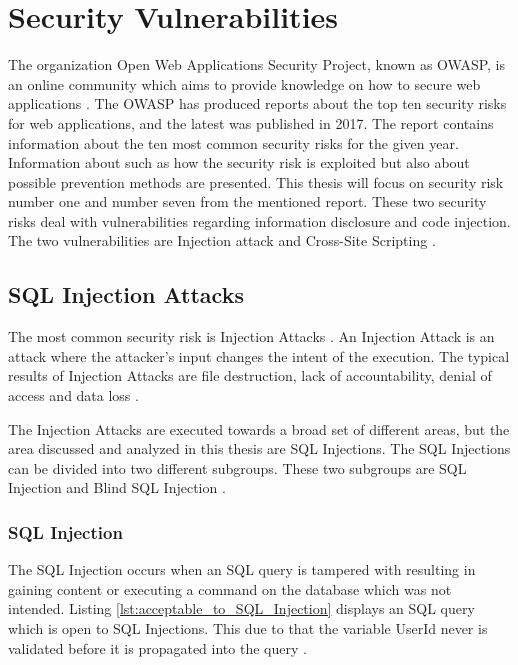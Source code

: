 \section{Security Vulnerabilities}
\label{SecurityVulnerabilities}
The organization Open Web Applications Security Project, known as OWASP, is an online community which aims to provide knowledge on how to secure web applications \parencite{OpenWebApplicationSecurityProject}. The OWASP has produced reports about the top ten security risks for web applications, and the latest was published in 2017. The report contains information about the ten most common security risks for the given year. Information about such as how the security risk is exploited but also about possible prevention methods are presented. This thesis will focus on security risk number one and number seven from the mentioned report. These two security risks deal with vulnerabilities regarding information disclosure and code injection. The two vulnerabilities are Injection attack and Cross-Site Scripting \parencite{OWASP2017}.



\subsection{SQL Injection Attacks}
The most common security risk is Injection Attacks \parencite{OWASP2017}. An Injection Attack is an attack where the attacker's input changes the intent of the execution. The typical results of Injection Attacks are file destruction, lack of accountability, denial of access and data loss \parencite{Secure_Web}.

The Injection Attacks are executed towards a broad set of different areas, but the area discussed and analyzed in this thesis are SQL Injections. The SQL Injections can be divided into two different subgroups. These two subgroups are SQL Injection and Blind SQL Injection \parencite{Secure_Web}.



\subsubsection{SQL Injection}
The SQL Injection occurs when an SQL query is tampered with resulting in gaining content or executing a command on the database which was not intended. Listing \ref{lst:acceptable_to_SQL_Injection} displays an SQL query which is open to SQL Injections. This due to that the variable UserId never is validated before it is propagated into the query \parencite{JustinClarke-Salt2009SIAa, Secure_Web}.

